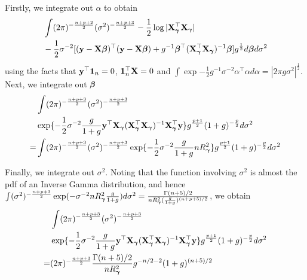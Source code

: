 \documentclass{amsart}[12pt]
\theoremstyle{definition}
\begin{document}
Firstly, we integrate out $\alpha$ to obtain
\begin{align*}
&\int (2 \pi)^{-\frac{n + p + 2}{2}} (\sigma^2)^{-\frac{n + p + 3}{2}} - \frac{1}{2} \log |{\bf X}_{\boldsymbol \gamma}^\top {\bf X}_{\boldsymbol \gamma}| \\
		&-\frac{1}{2}\sigma^{-2}[({\bf y} - {\bf X} {\boldsymbol \beta})^\top ({\bf y} - {\bf X} {\boldsymbol \beta})
		+ g^{-1} {\boldsymbol \beta}^\top ({\bf X}_{\boldsymbol \gamma}^\top {\bf X}_{\boldsymbol \gamma})^{-1} {\boldsymbol \beta}
		] g^{\frac{1}{2}}d {\boldsymbol \beta} d \sigma^2
\end{align*}
using the facts that ${\bf y}^\top {\bf1}_n = 0$, ${\bf 1}_n^\top {\bf X} = 0$ and $\int \exp{-\frac{1}{2} g^{-1} \sigma^{-2} \alpha^\top \alpha} d \alpha = |2 \pi g \sigma^2|^{\frac{1}{2}}$.
Next, we integrate out ${\boldsymbol \beta}$
\begin{align*}
	&\int (2 \pi)^{-\frac{n + p + 3}{2}} (\sigma^2)^{-\frac{n + p + 3}{2}} \\
	&\exp \{-\frac{1}{2} \sigma^{-2} \frac{g}{1 + g} {\bf y}^\top {\bf X}_{\boldsymbol \gamma} ({\bf X}_{\boldsymbol \gamma}^\top {\bf X}_{\boldsymbol \gamma})^{-1} {\bf X}_{\boldsymbol \gamma}^\top {\bf y}\} g^{\frac{p + 1}{2}} (1 + g)^{-\frac{p}{2}} d \sigma^2 \\
	=&\int (2 \pi)^{-\frac{n + p + 3}{2}} (\sigma^2)^{-\frac{n + p + 3}{2}} \exp \{-\frac{1}{2} \sigma^{-2} \frac{g}{1 + g} n R^2_{\boldsymbol \gamma} \} g^{\frac{p + 1}{2}} (1 + g)^{-\frac{p}{2}} d \sigma^2 \\
\end{align*}

Finally, we integrate out $\sigma^2$. Noting that the function involving $\sigma^2$ is almost the pdf of an
Inverse Gamma distribution, and hence
$\int (\sigma^2)^{-\frac{n + p + 3}{2}} \exp (-\sigma^{-2} n R^2_{\boldsymbol \gamma} \frac{g}{1 + g}) d \sigma^2
= \frac{\Gamma(n + 5)/2}{n R^2_{\boldsymbol \gamma} (\frac{g}{1 + g})^{(n + p + 5)/2}}$,
we obtain
\begin{align*}
	&\int (2 \pi)^{-\frac{n + p + 3}{2}} (\sigma^2)^{-\frac{n + p + 3}{2}} \\
	&\exp \{-\frac{1}{2} \sigma^{-2} \frac{g}{1 + g} {\bf y}^\top {\bf X}_{\boldsymbol \gamma} ({\bf X}_{\boldsymbol \gamma}^\top {\bf X}_{\boldsymbol \gamma})^{-1} {\bf X}_{\boldsymbol \gamma}^\top {\bf y}\} g^{\frac{p + 1}{2}} (1 + g)^{-\frac{p}{2}} d \sigma^2 \\
	=&(2 \pi)^{-\frac{n + p + 3}{2}} \frac{\Gamma(n + 5)/2}{n R^2_{\boldsymbol \gamma}} g^{-n/2 - 2} (1 + g)^{(n + 5)/2}   \\
\end{align*}



\end{document}
